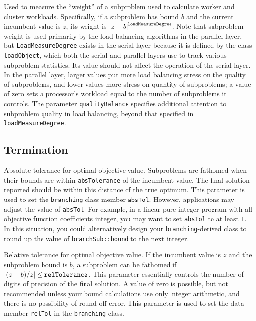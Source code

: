 Used to
measure the ``weight'' of a subproblem used to calculate worker and
cluster workloads.  Specifically, if a subproblem has bound $b$ and
the current incumbent value is $z$, its weight is ${\left|z -
b\right|}^{\text{\texttt{loadMeasureDegree}}}$.  Note that subproblem
weight is used primarily by the load balancing algorithms in the
parallel layer, but \texttt{LoadMeasureDegree} exists in the serial
layer because it is defined by the class \texttt{loadObject}, which
both the serial and parallel layers use to track various subproblem
statistics.  Its value should not affect the operation of the serial
layer.  In the parallel layer, larger values put more load balancing
stress on the quality of subproblems, and lower values more stress on
quantity of subproblems; a value of zero sets a processor's workload
equal to the number of subproblems it controls.  The parameter
\texttt{qualityBalance} specifies additional attention to subproblem
quality in load balancing, beyond that specified in
\texttt{loadMeasureDegree}. 


\subsection{Termination}
\vspace{-3ex} 
Absolute
tolerance for optimal objective value.  Subproblems are fathomed when
their bounds are within \texttt{absTolerance} of the incumbent value.
The final solution reported should be within this distance of the true
optimum.  This parameter is used to set the \texttt{branching} class
member \texttt{absTol}.  However, applications may adjust the value
of \texttt{absTol}.  For example, in a linear pure integer program
with all objective function coefficients integer, you may want to set
\texttt{absTol} to at least $1$.  In this situation, you could
alternatively design your \texttt{branching}-derived class to round up
the value of \texttt{branchSub::bound} to the next integer.

Relative tolerance for optimal objective value.  If the incumbent
value is $z$ and the subproblem bound is $b$, a subproblem can be
fathomed if ${\left|(z - b)/z\right|} \leq
\text{\texttt{relTolerance}}$.  This parameter essentially controls the
number of digits of precision of the final solution.  A
value of zero is possible, but not recommended unless your bound
calculations use only integer arithmetic, and there is no possibility
of round-off error.  This parameter is used to set the data member
\texttt{relTol} in the \texttt{branching} class.


